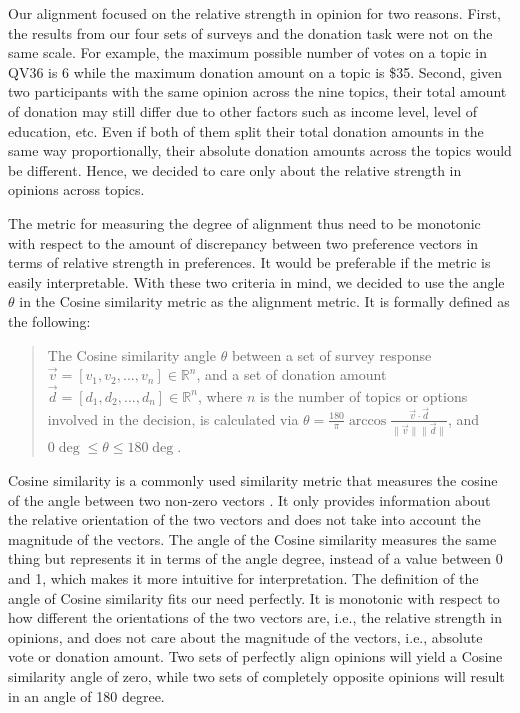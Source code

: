 Our alignment focused on the relative strength in opinion for two reasons. First, the results from our four sets of surveys and the donation task were not on the same scale. For example, the maximum possible number of votes on a topic in QV36 is 6 while the maximum donation amount on a topic is \$35. Second, given two participants with the same opinion across the nine topics, their total amount of donation may still differ due to other factors such as income level, level of education, etc. Even if both of them split their total donation amounts in the same way proportionally, their absolute donation amounts across the topics would be different. Hence, we decided to care only about the relative strength in opinions across topics.

The metric for measuring the degree of alignment thus need to be monotonic with respect to the amount of discrepancy between two preference vectors in terms of relative strength in preferences. It would be preferable if the metric is easily interpretable. With these two criteria in mind, we decided to use the angle $\theta$ in the Cosine similarity metric as the alignment metric. It is formally defined as the following: \par

\begin{quote}
    The Cosine similarity angle $\theta$ between a set of survey response $\vec{v} = [v_1, v_2, ..., v_n] \in \mathbb{R}^n$, and a set of donation amount $\vec{d} = [d_1, d_2, ..., d_n] \in \mathbb{R}^n$, where $n$ is the number of topics or options involved in the decision, is calculated via $\theta = \frac{180}{\pi} \arccos{\frac{\vec{v} \cdot \vec{d}}{\|\vec{v}\| \|\vec{d}\|}}$, and $0\deg \leq \theta \leq 180\deg$.
\end{quote}

Cosine similarity is a commonly used similarity metric that measures the cosine of the angle between two non-zero vectors \cite{singhal2001modern}. It only provides information about the relative orientation of the two vectors and does not take into account the magnitude of the vectors. The angle of the Cosine similarity measures the same thing but represents it in terms of the angle degree, instead of a value between 0 and 1, which makes it more intuitive for interpretation. The definition of the angle of Cosine similarity fits our need perfectly. It is monotonic with respect to how different the orientations of the two vectors are, i.e., the relative strength in opinions, and does not care about the magnitude of the vectors, i.e., absolute vote or donation amount. Two sets of perfectly align opinions will yield a Cosine similarity angle of zero, while two sets of completely opposite opinions will result in an angle of 180 degree.


